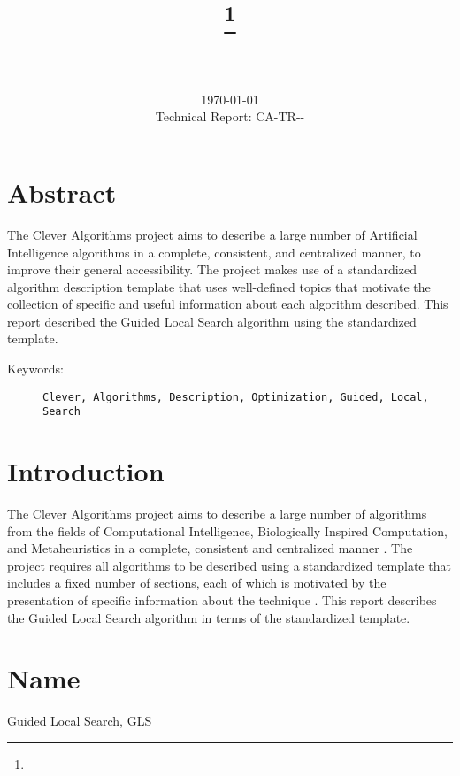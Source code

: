 \documentclass[a4paper, 11pt]{article}
\title{{\myreporttitle}\footnote{\myreportlicense}}
\author{\myreportauthor\\{\myreportemail}\\\small\myreportproject}
\date{\today\\{\small{Technical Report: CA-TR-{\myreportdate}-\myreportversion}}}
\begin{document}
\maketitle

\section*{Abstract} 
The Clever Algorithms project aims to describe a large number of Artificial Intelligence algorithms in a complete, consistent, and centralized manner, to improve their general accessibility. 
The project makes use of a standardized algorithm description template that uses well-defined topics that motivate the collection of specific and useful information about each algorithm described.
This report described the Guided Local Search algorithm using the standardized template.

\begin{description}
	\item[Keywords:] {\small\texttt{Clever, Algorithms, Description, Optimization, Guided, Local, Search}}
\end{description} 

\section{Introduction} 
\label{sec:intro}
The Clever Algorithms project aims to describe a large number of algorithms from the fields of Computational Intelligence, Biologically Inspired Computation, and Metaheuristics in a complete, consistent and centralized manner \cite{Brownlee2010}.
The project requires all algorithms to be described using a standardized template that includes a fixed number of sections, each of which is motivated by the presentation of specific information about the technique \cite{Brownlee2010a}.
This report describes the Guided Local Search algorithm in terms of the standardized template.

\section{Name} 
\label{sec:name}
Guided Local Search, GLS
\end{document}
